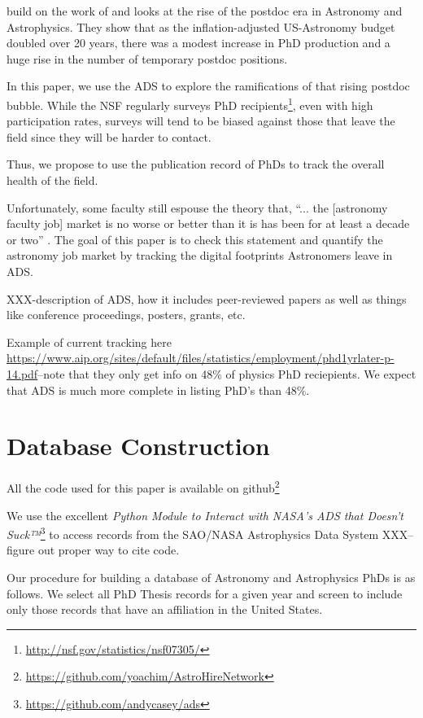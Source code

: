 \documentclass{emulateapj}
\begin{document}
\citet{Seth09} build on the work of \citet{Metcalfe08} and looks at the rise of the postdoc era in Astronomy and Astrophysics.  They show that as the inflation-adjusted US-Astronomy budget doubled over 20 years, there was a modest increase in PhD production and a huge rise in the number of temporary postdoc positions.

In this paper, we use the ADS to explore the ramifications of that rising postdoc bubble.  While the NSF regularly surveys PhD recipients\footnote{\url{http://nsf.gov/statistics/nsf07305/}}, even with high participation rates, surveys will tend to be biased against those that leave the field since they will be harder to contact.

Thus, we propose to use the publication record of PhDs to track the overall health of the field.  

Unfortunately, some faculty still espouse the theory that, ``... the [astronomy faculty job] market is no worse or better than it is has been for at least a decade or two'' \citep{Charfman12}.  The goal of this paper is to check this statement and quantify the astronomy job market by tracking the digital footprints Astronomers leave in ADS. 

XXX-description of ADS, how it includes peer-reviewed papers as well as things like conference proceedings, posters, grants, etc.

Example of current tracking here \url{https://www.aip.org/sites/default/files/statistics/employment/phd1yrlater-p-14.pdf}--note that they only get info on 48\% of physics PhD reciepients.  We expect that ADS is much more complete in listing PhD's than 48\%.


\section{Database Construction}\label{sec:db_construct}

All the code used for this paper is available on github\footnote{\url{https://github.com/yoachim/AstroHireNetwork}}

We use the excellent {\emph{Python Module to Interact with NASA's ADS that Doesn't Suck™}}\footnote{\url{https://github.com/andycasey/ads}} to access records from the SAO/NASA Astrophysics Data System XXX--figure out proper way to cite code. 

Our procedure for building a database of Astronomy and Astrophysics PhDs is as follows.  We select all PhD Thesis records for a given year and screen to include only those records that have an affiliation in the United States.
\end{document}

